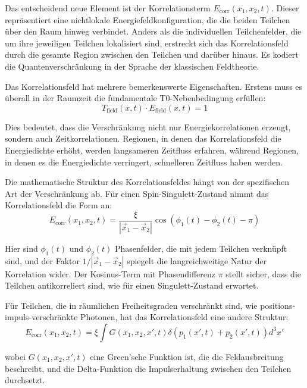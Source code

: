 \documentclass[12pt,a4paper]{article}
\newcommand{\xipar}{\xi}
\theoremstyle{definition}
\theoremstyle{remark}
\begin{document}
Das entscheidend neue Element ist der Korrelationsterm $E_{\text{corr}}(x_1,x_2,t)$. Dieser repr{\"a}sentiert eine nichtlokale Energiefeldkonfiguration, die die beiden Teilchen {\"u}ber den Raum hinweg verbindet. Anders als die individuellen Teilchenfelder, die um ihre jeweiligen Teilchen lokalisiert sind, erstreckt sich das Korrelationsfeld durch die gesamte Region zwischen den Teilchen und dar{\"u}ber hinaus. Es kodiert die Quantenverschr{\"a}nkung in der Sprache der klassischen Feldtheorie.

Das Korrelationsfeld hat mehrere bemerkenswerte Eigenschaften. Erstens muss es {\"u}berall in der Raumzeit die fundamentale T0-Nebenbedingung erf{\"u}llen:
$$T_{\text{field}}(x,t) \cdot E_{\text{field}}(x,t) = 1$$

Dies bedeutet, dass die Verschr{\"a}nkung nicht nur Energiekorrelationen erzeugt, sondern auch Zeitkorrelationen. Regionen, in denen das Korrelationsfeld die Energiedichte erh{\"o}ht, werden langsameren Zeitfluss erfahren, w{\"a}hrend Regionen, in denen es die Energiedichte verringert, schnelleren Zeitfluss haben werden.

Die mathematische Struktur des Korrelationsfeldes h{\"a}ngt von der spezifischen Art der Verschr{\"a}nkung ab. F{\"u}r einen Spin-Singulett-Zustand nimmt das Korrelationsfeld die Form an:
\begin{equation}
	E_{\text{corr}}(x_1,x_2,t) = \frac{\xipar}{|\vec{x}_1 - \vec{x}_2|} \cos(\phi_1(t) - \phi_2(t) - \pi)
	\label{eq:singlet_correlation}
\end{equation}

Hier sind $\phi_1(t)$ und $\phi_2(t)$ Phasenfelder, die mit jedem Teilchen verkn{\"u}pft sind, und der Faktor $1/|\vec{x}_1 - \vec{x}_2|$ spiegelt die langreichweitige Natur der Korrelation wider. Der Kosinus-Term mit Phasendifferenz $\pi$ stellt sicher, dass die Teilchen antikorreliert sind, wie f{\"u}r einen Singulett-Zustand erwartet.

F{\"u}r Teilchen, die in r{\"a}umlichen Freiheitsgraden verschr{\"a}nkt sind, wie positions-impuls-verschr{\"a}nkte Photonen, hat das Korrelationsfeld eine andere Struktur:
\begin{equation}
	E_{\text{corr}}(x_1,x_2,t) = \xipar \int G(x_1,x_2,x',t) \delta(p_1(x',t) + p_2(x',t)) d^3x'
	\label{eq:position_momentum_correlation}
\end{equation}

wobei $G(x_1,x_2,x',t)$ eine Green'sche Funktion ist, die die Feldausbreitung beschreibt, und die Delta-Funktion die Impulserhaltung zwischen den Teilchen durchsetzt.
\end{document}
